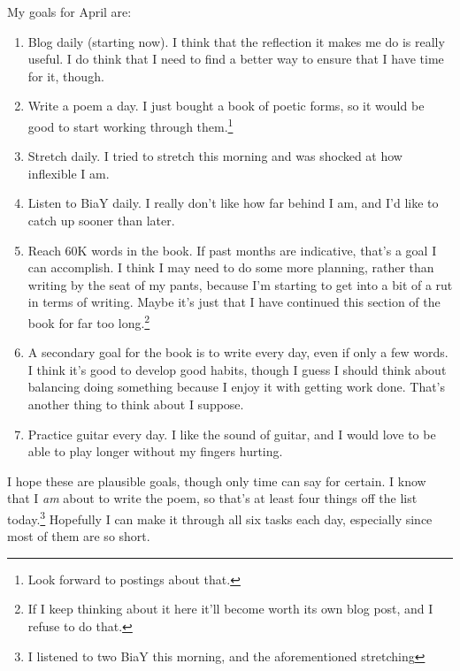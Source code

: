 \documentclass[12pt]{article}[titlepage]
\renewcommand{\,}{\textsuperscript{,}}
\begin{document}
My goals for April are:
\begin{enumerate}
\item Blog daily (starting now). I think that the reflection it makes me do is really useful. I do think that I need to find a better way to ensure that I have time for it, though.
\item Write a poem a day. I just bought a book of poetic forms, so it would be good to start working through them.\footnote{Look forward to postings about that.}
\item Stretch daily. I tried to stretch this morning and was shocked at how inflexible I am.
\item Listen to BiaY daily. I really don't like how far behind I am, and I'd like to catch up sooner than later.
\item Reach 60K words in the book. If past months are indicative, that's a goal I can accomplish. I think I may need to do some more planning, rather than writing by the seat of my pants, because I'm starting to get into a bit of a rut in terms of writing. Maybe it's just that I have continued this section of the book for far too long.\footnote{If I keep thinking about it here it'll become worth its own blog post, and I refuse to do that.}
\item A secondary goal for the book is to write every day, even if only a few words. I think it's good to develop good habits, though I guess I should think about balancing doing something because I enjoy it with getting work done. That's another thing to think about I suppose.
\item Practice guitar every day. I like the sound of guitar, and I would love to be able to play longer without my fingers hurting.
\end{enumerate}
I hope these are plausible goals, though only time can say for certain.
I know that I \emph{am} about to write the poem, so that's at least four things off the list today.\footnote{I listened to two BiaY this morning, and the aforementioned stretching}
Hopefully I can make it through all six tasks each day, especially since most of them are so short.
\end{document}

